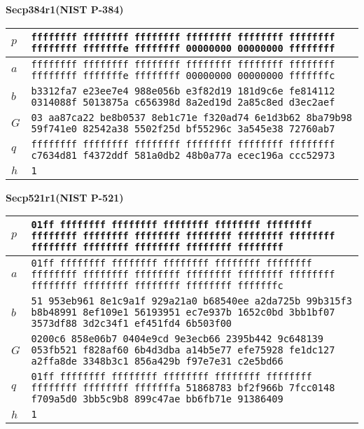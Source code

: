 \clearpage
\textbf{Secp384r1(NIST P-384)}
\par
\begin{tabularx}{\textwidth}{|l|>{\raggedright\arraybackslash}X|} \hline
    $p$ & \texttt{ffffffff ffffffff ffffffff ffffffff ffffffff ffffffff ffffffff fffffffe ffffffff 00000000 00000000 ffffffff} \\ \hline
    $a$ & \texttt{ffffffff ffffffff ffffffff ffffffff ffffffff ffffffff ffffffff fffffffe ffffffff 00000000 00000000 fffffffc} \\ \hline
    $b$ & \texttt{b3312fa7 e23ee7e4 988e056b e3f82d19 181d9c6e fe814112 0314088f 5013875a c656398d 8a2ed19d 2a85c8ed d3ec2aef} \\ \hline
    $G$ & \texttt{\phantom{000000}03 aa87ca22 be8b0537 8eb1c71e f320ad74 6e1d3b62 8ba79b98 59f741e0 82542a38 5502f25d bf55296c 3a545e38 72760ab7} \\ \hline
    $q$ & \texttt{ffffffff ffffffff ffffffff ffffffff ffffffff ffffffff c7634d81 f4372ddf 581a0db2 48b0a77a ecec196a ccc52973} \\ \hline
    $h$ & \texttt{1} \\ \hline
\end{tabularx}

\textbf{Secp521r1(NIST P-521)}
\par
\begin{tabularx}{\textwidth}{|l|>{\raggedright\arraybackslash}X|} \hline
    $p$ & \texttt{\phantom{0000}01ff ffffffff ffffffff ffffffff ffffffff ffffffff ffffffff ffffffff ffffffff ffffffff ffffffff ffffffff ffffffff ffffffff ffffffff ffffffff ffffffff} \\ \hline
    $a$ & \texttt{\phantom{0000}01ff ffffffff ffffffff ffffffff ffffffff ffffffff ffffffff ffffffff ffffffff ffffffff ffffffff ffffffff ffffffff ffffffff ffffffff ffffffff fffffffc} \\ \hline
    $b$ & \texttt{\phantom{000000}51 953eb961 8e1c9a1f 929a21a0 b68540ee a2da725b 99b315f3 b8b48991 8ef109e1 56193951 ec7e937b 1652c0bd 3bb1bf07 3573df88 3d2c34f1 ef451fd4 6b503f00} \\ \hline
    $G$ & \texttt{\phantom{00}0200c6 858e06b7 0404e9cd 9e3ecb66 2395b442 9c648139 053fb521 f828af60 6b4d3dba a14b5e77 efe75928 fe1dc127 a2ffa8de 3348b3c1 856a429b f97e7e31 c2e5bd66} \\ \hline
    $q$ & \texttt{\phantom{0000}01ff ffffffff ffffffff ffffffff ffffffff ffffffff ffffffff ffffffff fffffffa 51868783 bf2f966b 7fcc0148 f709a5d0 3bb5c9b8 899c47ae bb6fb71e 91386409} \\ \hline
    $h$ & \texttt{1} \\ \hline
\end{tabularx}


